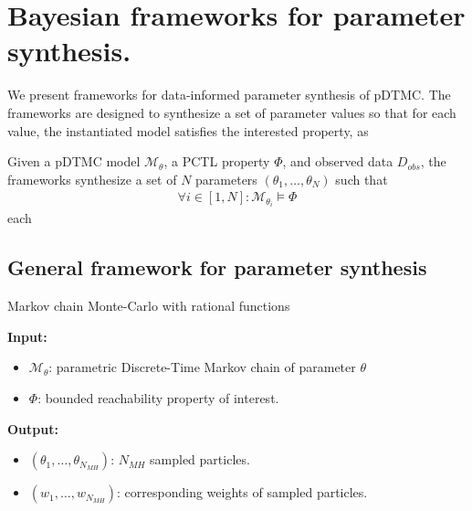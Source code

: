 \chapter{Bayesian frameworks for parameter synthesis.}
We present frameworks for data-informed parameter synthesis of pDTMC. The frameworks are designed to
synthesize a set of parameter values so that for each value, the instantiated model satisfies the
interested property, as

Given a pDTMC model $\mathcal{M}_\theta$, a PCTL property $\Phi$, and observed data $D_{obs}$, the
frameworks synthesize a set of $N$ parameters $(\theta_1,\ldots,\theta_N)$ such that
\begin{align*}
      \forall i \in [1,N]: \mathcal{M}_{\theta_i} \models \Phi
\end{align*}
each

\section{General framework for parameter synthesis}
\begin{algorithm}[H]
      \caption{Markov chain Monte-Carlo with rational functions}
      \label{rf-mcmc-alg}
      \hspace*{\algorithmicindent} \textbf{Input:}
      \begin{itemize}
            \item $\mathcal{M}_\theta$: parametric Discrete-Time Markov chain of parameter $\theta$
            \item $\Phi$: bounded reachability property of interest.
      \end{itemize}
      \hspace*{\algorithmicindent} \textbf{Output:}
      \begin{itemize}
            \item $(\theta_1,\ldots,\theta_{N_{MH}})$: $N_{MH}$ sampled particles.
            \item $(w_1,\ldots,w_{N_{MH}})$: corresponding weights of sampled particles.
      \end{itemize}
      \begin{algorithmic}[1]

            \EndProcedure
      \end{algorithmic}
\end{algorithm}

